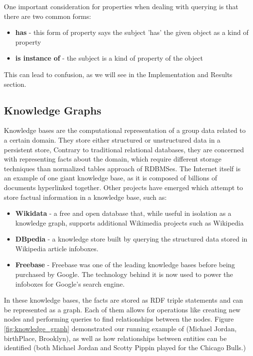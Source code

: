 \documentclass[sigplan,screen]{acmart}
\begin{document}
One important consideration for properties when dealing with querying is that there are two common forms:

\begin{itemize}
    \item \textbf{has} - this form of property says the subject 'has' the given object as a kind of property
    \item \textbf{is instance of} - the subject is a kind of property of the object
\end{itemize}

This can lead to confusion, as we will see in the Implementation and Results section.

\subsection{Knowledge Graphs}

Knowledge bases are the computational representation of a group data related to a certain domain. They store either structured or unstructured data in a persistent store, Contrary to traditional relational databases, they are concerned with representing facts about the domain, which require different storage techniques than normalized tables approach of RDBMSes. The Internet itself is an example of one giant knowledge base, as it is composed of billions of documents hyperlinked together. Other projects have emerged which attempt to store factual information in a knowledge base, such as:

\begin{itemize}
    \item \textbf{Wikidata} - a free and open database that, while useful in isolation as a knowledge graph, supports additional Wikimedia projects such as Wikipedia
    \item \textbf{DBpedia} - a knowledge store built by querying the structured data stored in Wikipedia article infoboxes.
    \item \textbf{Freebase} - Freebase was one of the leading knowledge bases before being purchased by Google. The technology behind it is now used to power the infoboxes for Google's search engine.
\end{itemize}

In these knowledge bases, the facts are stored as RDF triple statements and can be represented as a graph. Each of them allows for operations like creating new nodes and performing queries to find relationships between the nodes. Figure \ref{fig:knowledge_graph} demonstrated our running example of (Michael Jordan, birthPlace, Brooklyn), as well as how relationships between entities can be identified (both Michael Jordan and Scotty Pippin played for the Chicago Bulls.)
\end{document}
